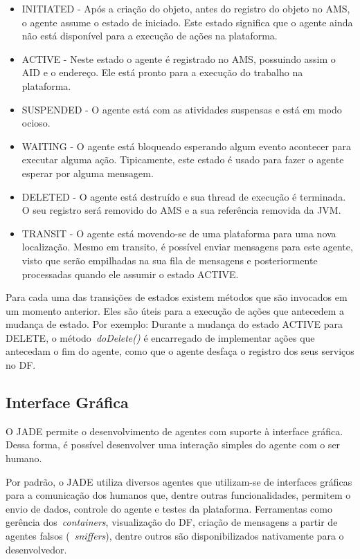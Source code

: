\begin{itemize}
	\item INITIATED - Após a criação do objeto, antes do registro do objeto no AMS, o agente assume o estado de iniciado. Este estado significa que o agente ainda não está disponível para a execução de ações na  plataforma.
	\item ACTIVE - Neste estado o agente é registrado no AMS, possuindo assim o AID e o endereço. Ele está pronto para a execução do trabalho na plataforma.
	\item SUSPENDED - O agente está com as atividades suspensas e está em modo ocioso.
	\item WAITING - O agente está bloqueado esperando algum evento acontecer para executar alguma ação. Tipicamente, este estado é usado para fazer o agente esperar por alguma mensagem.
	\item DELETED - O agente está destruído e sua thread de execução é terminada. O seu registro será removido do AMS e a sua referência removida da JVM.
	\item TRANSIT - O agente está movendo-se de uma plataforma para uma nova localização. Mesmo em transito, é possível enviar mensagens para este agente, visto que serão empilhadas na sua fila de mensagens e posteriormente processadas quando ele assumir o estado ACTIVE.
\end{itemize}

Para cada uma das transições de estados existem métodos que são invocados em um momento anterior. Eles são úteis para a execução de ações que antecedem a mudança de estado. Por exemplo: Durante a mudança do estado ACTIVE para DELETE, o método~\emph{doDelete()} é encarregado de implementar ações que antecedam o fim do agente, como que o agente desfaça o registro dos seus serviços no DF.

\subsection{Interface Gráfica}
O JADE permite o desenvolvimento de agentes com suporte à interface gráfica. Dessa forma, é possível desenvolver uma interação simples do agente com o ser humano.


Por padrão, o JADE utiliza diversos agentes que utilizam-se de interfaces gráficas para a comunicação dos humanos que, dentre outras funcionalidades, permitem o envio de dados, controle do agente e testes da plataforma. Ferramentas como gerência dos~\emph{containers}, visualização do DF, criação de mensagens a partir de agentes falsos (~\emph{sniffers}), dentre outros são disponibilizados nativamente para o desenvolvedor.

